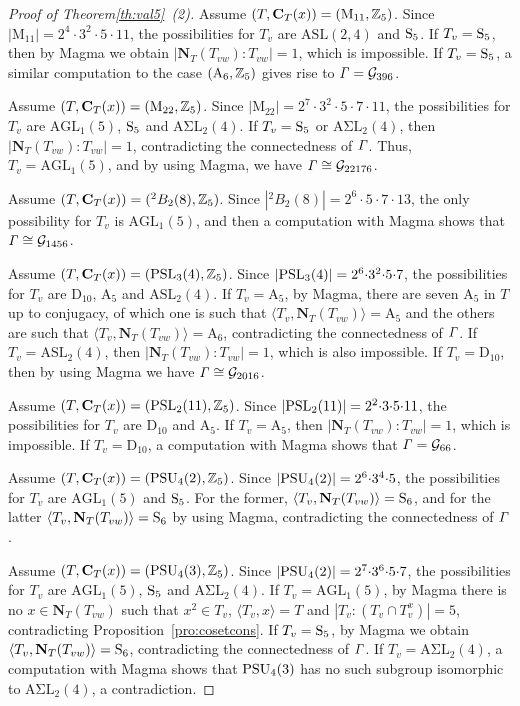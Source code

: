 \documentclass[12pt,reqno]{amsart}
\newcommand\A{\mathrm{A}} \newcommand\AGL{\mathrm{AGL}} \newcommand\AGammaL{\mathrm{A\Gamma L}} \newcommand\Alt{\mathrm{Alt}} \newcommand\ASL{\mathrm{ASL}} \newcommand\ASigmaL{\mathrm{A \Sigma L}} \newcommand\Aut{\mathrm{Aut}}
\def\C{\mathbf{C}}   \newcommand\Cay{\mathrm{Cay}}   \newcommand\Cos{\mathrm{Cos}} \newcommand{\CGammaSp}{\mathrm{C\Gamma Sp}}
\newcommand\D{\mathrm{D}}   \def\det{{\sf det}}
\newcommand\M{\mathrm{M}} \newcommand{\magma}{{\sc Magma}} \renewcommand \mod{{\rm mod~}}
\newcommand\N{\mathbf{N}}
\newcommand{\cG}{\mathcal{G}}
\numberwithin {equation} {section}
\begin{document}
\begin{proof}[Proof of Theorem\ref{th:val5}~{\rm(2)}]
Assume $(T,\C_T(x))=(\M_{11}, \ZZ_5)$. Since $|\M_{11}|=2^4{\cdot}3^2{\cdot}5{\cdot}11$, the possibilities for  $T_v $ are $\ASL(2,4)$ and $\mathrm{S}_{5}$. If $T_v=\mathrm{S}_5$, then by {\sc Magma} we obtain $|\N_T(T_{vw}):T_{vw}|=1$, which is impossible. If $T_v=\mathrm{S}_5$, a similar computation to the case $(\A_6,\ZZ_5)$ gives rise to $\Ga=\cG_{396}$.

Assume $(T,\C_T(x))=(\M_{22}, \ZZ_{5})$. Since $|\M_{22}|=2^7{\cdot}3^2{\cdot}5{\cdot}7{\cdot}11$,  the possibilities for  $ T_v $ are $\AGL_1(5)$, $\mathrm{S}_5$ and $\ASigmaL_2(4)$. If $T_v=\mathrm{S}_5$ or $\ASigmaL_2(4)$, then $|\N_T(T_{vw}):T_{vw}|=1$, contradicting the connectedness of ${\it \Gamma}$. Thus, $T_v=\AGL_1(5)$, and by using {\sc Magma}, we have $\Ga\cong\cG_{22176}$.

Assume $(T,\C_T(x))=({}^2B_2(8), \ZZ_{5})$. Since $|{}^2B_2(8)|=2^6 {\cdot} 5  {\cdot}7  {\cdot}13$, the only possibility for $ T_v $ is $\AGL_1(5) $, and then a computation with {\sc Magma} shows that $\Ga\cong \cG_{1456}$.

Assume $(T,\C_T(x))=(\PSL_3(4), \ZZ_{5})$. Since $|\mathrm{PSL}_3(4)|=2^6 {\cdot}3^2 {\cdot}5 {\cdot}7$, the  possibilities for  $ T_v $ are $\D_{10}$, $\A_5$ and $\ASL_2(4)$. If $T_v=\A_{5}$, by {\sc Magma}, there are seven $\A_5$ in $T$ up to conjugacy, of which one is such that $\langle T_v,\N_T(T_{vw})\rangle=\A_5$ and the others are such that $\langle T_v,\N_T(T_{vw})\rangle=\A_6$, contradicting the connectedness of ${\it \Gamma}$. If $T_v=\ASL_2(4)$, then $|\N_T(T_{vw}):T_{vw}|=1$, which is also impossible. If $T_v=\D_{10}$, then by using {\sc Magma} we have $\Ga\cong \cG_{2016}$.

Assume $(T,\C_T(x))=(\PSL_2(11), \ZZ_{5})$. Since $|\mathrm{PSL}_2(11)|=2^2 {\cdot}3 {\cdot}5 {\cdot} 11$, the  possibilities for  $ T_v $ are $\D_{10}$ and $\A_5$. If $T_v=\A_{5}$, then $|\N_T(T_{vw}):T_{vw}|=1$, which is impossible. If $T_v=\D_{10}$, a computation with {\sc Magma} shows that $\Ga=\cG_{66}$.

Assume $(T,\C_T(x))=(\PSU_4(2), \ZZ_{5})$.  Since $|\mathrm{PSU}_4(2)|=2^6 {\cdot}3^4 {\cdot}5$, the  possibilities for  $ T_v $ are $\AGL_1(5)$ and $\mathrm{S}_5$. For the former, $\langle T_v,\N_T(T_{vw})\rangle=\Sy_6$, and for the latter $\langle T_v,\N_T(T_{vw})\rangle=\Sy_6$ by using {\sc Magma}, contradicting the connectedness of ${\it \Gamma}$.


Assume $(T,\C_T(x))=(\PSU_4(3), \ZZ_{5})$. Since $|\mathrm{PSU}_4(2)|=2^7{\cdot}3^6{\cdot}5{\cdot}7$, the  possibilities for  $ T_v $ are $\AGL_1(5)$, $\mathrm{S}_5$ and $\ASigmaL_2(4)$. If $T_v=\AGL_1(5)$, by {\sc Magma} there is no $x \in \N_T(T_{vw}) $ such that  $x^2 \in T_v$, $\langle T_v,x\rangle=T$ and $|T_v:(T_v \cap T_v^x)|=5$, contradicting Proposition~\ref{pro:cosetcons}. If $T_v=\mathrm{S}_{5}$, by {\sc Magma} we obtain  $\langle T_v,\N_T(T_{vw})\rangle=\Sy_6$, contradicting the connectedness of ${\it \Gamma}$. If $T_v=\ASigmaL_2(4)$, a computation with {\sc Magma} shows that $\mathrm{PSU}_4(3)$ has no such subgroup isomorphic to $\ASigmaL_2(4)$, a contradiction.


\end{proof}
\end{document}

